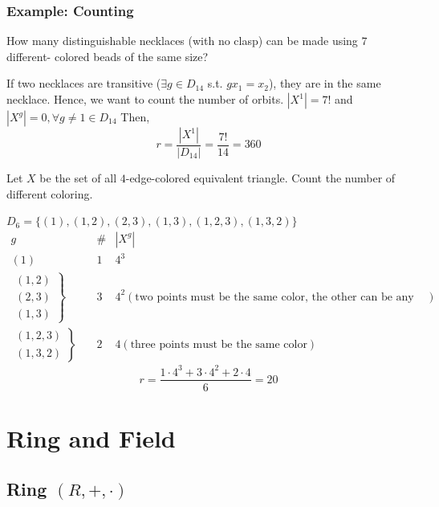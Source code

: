 \documentclass[11pt]{elegantbook}
\begin{document}
\subsection{Example: Counting}
\begin{example}
    How many distinguishable necklaces (with no clasp) can be made using $7$ different-
    colored beads of the same size?
\end{example}
If two necklaces are transitive ($\exists g\in D_14$ s.t. $gx_1=x_2$), they are in the same necklace. Hence, we want to count the number of orbits. $|X^{1}|=7!$ and $|X^g|=0,\forall g\neq 1\in D_{14}$ Then, $$r=\frac{|X^{1}|}{|D_14|}=\frac{7!}{14}=360$$

\begin{example}
    Let $X$ be the set of all $4$-edge-colored equivalent triangle. Count the number of different coloring.
\end{example}
$D_6=\{(1),(1,2),(2,3),(1,3),(1,2,3),(1,3,2)\}$
\begin{equation}
    \begin{aligned}
        g\quad&\#&|X^g|\\
        (1)\quad&1&4^3\\
        \left.\begin{matrix}
            (1,2)\\
            (2,3)\\
            (1,3)
        \end{matrix}\right\}\quad&3&4^2(\text{two points must be the same color, the other can be any color})\\
        \left.\begin{matrix}
            (1,2,3)\\
            (1,3,2)
        \end{matrix}\right\}\quad&2&4(\text{three points must be the same color})
    \end{aligned}
    \nonumber
\end{equation}
$$r=\frac{1\cdot 4^3+3\cdot 4^2+2\cdot 4}{6}=20$$

\chapter{Ring and Field}
\section{Ring $(R,+,\cdot)$}
\end{document}
